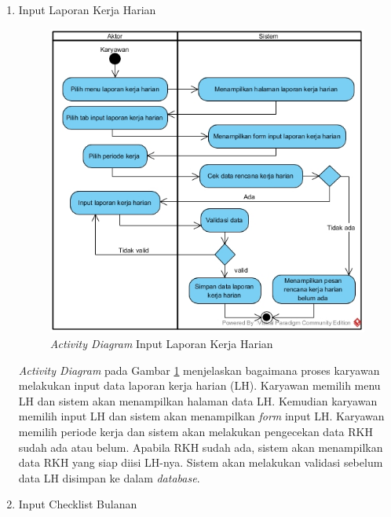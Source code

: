 \begin{enumerate}
\begin{enumerate}[label=\alph*.]
            		    \item Input Laporan Kerja Harian
            		    \begin{figure}[H]
                		    \centering                		    \includegraphics[width=11cm]{gambar/activity/input-laporan-kerja-harian}
                		    \caption{\emph{Activity Diagram} Input Laporan Kerja Harian}
                		    \label{activity_input_lh}
                		\end{figure}
                		\emph{Activity Diagram} pada Gambar \ref{activity_input_lh} menjelaskan bagaimana proses karyawan melakukan input data laporan kerja harian (LH). Karyawan memilih menu LH dan sistem akan menampilkan halaman data LH. Kemudian karyawan memilih input LH dan sistem akan menampilkan \emph{form} input LH. Karyawan memilih periode kerja dan sistem akan melakukan pengecekan data RKH sudah ada atau belum. Apabila RKH sudah ada, sistem akan menampilkan data RKH yang siap diisi LH-nya. Sistem akan melakukan validasi sebelum data LH disimpan ke dalam \emph{database}.\newpage
            		    \item Input Checklist Bulanan
            		    \begin{figure}[H]

\end{figure}
\end{enumerate}
\end{enumerate}
